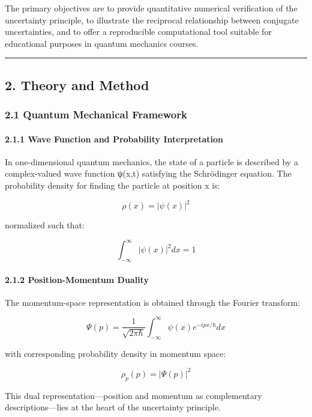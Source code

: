 \documentclass[
]{article}
\begin{document}
The primary objectives are to provide quantitative numerical
verification of the uncertainty principle, to illustrate the reciprocal
relationship between conjugate uncertainties, and to offer a
reproducible computational tool suitable for educational purposes in
quantum mechanics courses.

\begin{center}\rule{0.5\linewidth}{0.5pt}\end{center}

\subsection{2. Theory and Method}\label{theory-and-method}

\subsubsection{2.1 Quantum Mechanical
Framework}\label{quantum-mechanical-framework}

\paragraph{2.1.1 Wave Function and Probability
Interpretation}\label{wave-function-and-probability-interpretation}

In one-dimensional quantum mechanics, the state of a particle is
described by a complex-valued wave function ψ(x,t) satisfying the
Schrödinger equation. The probability density for finding the particle
at position x is:

\[\rho(x) = |\psi(x)|^2\]

normalized such that:

\[\int_{-\infty}^{\infty} |\psi(x)|^2 dx = 1\]

\paragraph{2.1.2 Position-Momentum
Duality}\label{position-momentum-duality}

The momentum-space representation is obtained through the Fourier
transform:

\[\Psi(p) = \frac{1}{\sqrt{2\pi\hbar}}\int_{-\infty}^{\infty} \psi(x)e^{-ipx/\hbar}dx\]

with corresponding probability density in momentum space:

\[\rho_p(p) = |\Psi(p)|^2\]

This dual representation---position and momentum as complementary
descriptions---lies at the heart of the uncertainty principle.
\end{document}
